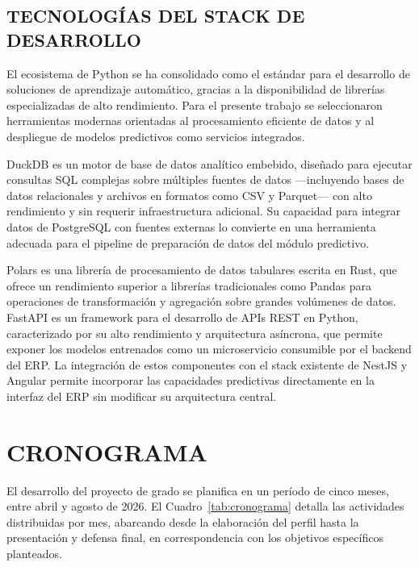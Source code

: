 \documentclass{univalle-perfil}
\begin{document}
\subsection{TECNOLOGÍAS DEL STACK DE DESARROLLO}

El ecosistema de Python se ha consolidado como el estándar para el desarrollo de soluciones de aprendizaje automático, gracias a la disponibilidad de librerías especializadas de alto rendimiento. Para el presente trabajo se seleccionaron herramientas modernas orientadas al procesamiento eficiente de datos y al despliegue de modelos predictivos como servicios integrados.

DuckDB es un motor de base de datos analítico embebido, diseñado para ejecutar consultas SQL complejas sobre múltiples fuentes de datos —incluyendo bases de datos relacionales y archivos en formatos como CSV y Parquet— con alto rendimiento y sin requerir infraestructura adicional. Su capacidad para integrar datos de PostgreSQL con fuentes externas lo convierte en una herramienta adecuada para el pipeline de preparación de datos del módulo predictivo.

Polars es una librería de procesamiento de datos tabulares escrita en Rust, que ofrece un rendimiento superior a librerías tradicionales como Pandas para operaciones de transformación y agregación sobre grandes volúmenes de datos. FastAPI es un framework para el desarrollo de APIs REST en Python, caracterizado por su alto rendimiento y arquitectura asíncrona, que permite exponer los modelos entrenados como un microservicio consumible por el backend del ERP. La integración de estos componentes con el stack existente de NestJS y Angular permite incorporar las capacidades predictivas directamente en la interfaz del ERP sin modificar su arquitectura central.

\section{CRONOGRAMA}

El desarrollo del proyecto de grado se planifica en un período de cinco meses, entre abril y agosto de 2026. El Cuadro~\ref{tab:cronograma} detalla las actividades distribuidas por mes, abarcando desde la elaboración del perfil hasta la presentación y defensa final, en correspondencia con los objetivos específicos planteados.
\end{document}
